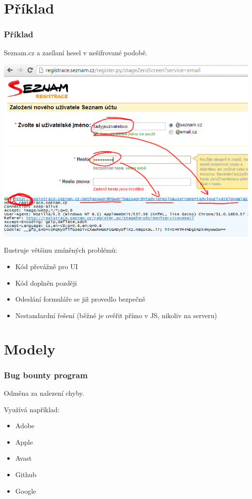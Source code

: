 \documentclass[xetex]{beamer}
\begin{document}
\section{Příklad}
\begin{frame}
	\frametitle{Příklad}

	Seznam.cz a zasílaní hesel v nešifrované podobě.

	\includegraphics[scale=0.3]{pic/seznam.png}
\end{frame}

\begin{frame}
	Ilustruje většinu zmíněných problémů:
	\begin{itemize}
		\item Kód převážně pro UI
		\item Kód doplněn později
		\item Odeslání formuláře se již provedlo bezpečně
		\item Nestandardní řešení (běžné je ověřit přímo v JS, nikoliv na serveru)
	\end{itemize}
\end{frame}

\section{Modely}

\begin{frame}
	\frametitle{Bug bounty program}
	Odměna za nalezení chyby.

	\medskip

	Využívá například:
	\begin{itemize}
		\item Adobe
		\item Apple
		\item Avast
		\item Github
		\item Google
	\end{itemize}
\end{frame}
\end{document}
